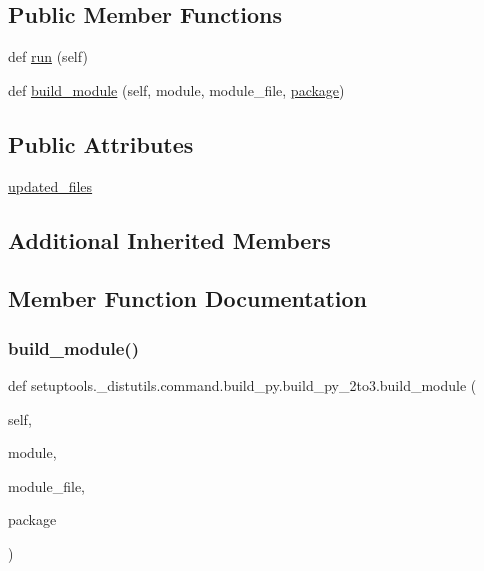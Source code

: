 \subsection*{Public Member Functions}
\begin{DoxyCompactItemize}
\item 
def \hyperlink{classsetuptools_1_1__distutils_1_1command_1_1build__py_1_1build__py__2to3_a21f01f36b7fd42df6e12713f67f2b404}{run} (self)
\item 
def \hyperlink{classsetuptools_1_1__distutils_1_1command_1_1build__py_1_1build__py__2to3_afa86f73d8f02bdb8637e82d097958dad}{build\+\_\+module} (self, module, module\+\_\+file, \hyperlink{classsetuptools_1_1__distutils_1_1command_1_1build__py_1_1build__py_a9166969e65bc8431af32d65df47d6905}{package})
\end{DoxyCompactItemize}
\subsection*{Public Attributes}
\begin{DoxyCompactItemize}
\item 
\hyperlink{classsetuptools_1_1__distutils_1_1command_1_1build__py_1_1build__py__2to3_a0d0be906569385f4d9800b2577b2f62d}{updated\+\_\+files}
\end{DoxyCompactItemize}
\subsection*{Additional Inherited Members}


\subsection{Member Function Documentation}
\mbox{\label{classsetuptools_1_1__distutils_1_1command_1_1build__py_1_1build__py__2to3_afa86f73d8f02bdb8637e82d097958dad}} 
\subsubsection{\texorpdfstring{build\+\_\+module()}{build\_module()}}
{\footnotesize\ttfamily def setuptools.\+\_\+distutils.\+command.\+build\+\_\+py.\+build\+\_\+py\+\_\+2to3.\+build\+\_\+module (\begin{DoxyParamCaption}\item[{}]{self,  }\item[{}]{module,  }\item[{}]{module\+\_\+file,  }\item[{}]{package }\end{DoxyParamCaption})}

